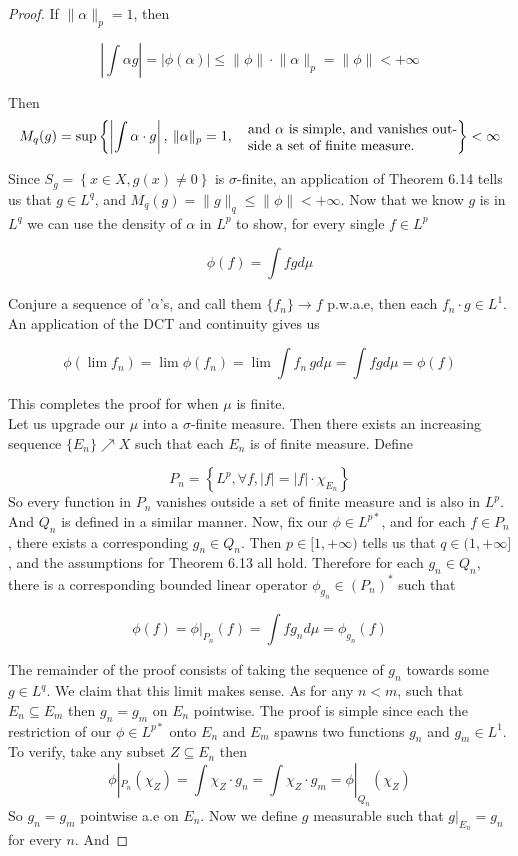 \documentclass[../../main.tex]{subfiles}
\begin{document}
\begin{proof}
If $\lVert \alpha \rVert_p = 1$, then 

$$
\left|\int\alpha g\right| = \left|\phi(\alpha)\right| \leq \lVert \phi \rVert\cdot \lVert \alpha\rVert_p  = \lVert \phi \rVert < +\infty
$$

Then 
\[M_q(g) = \sup\left\{\left|\int \alpha\cdot g\right|,\: \lVert \alpha \rVert_p = 1,\quad  \parbox{15em}{ and $\alpha$ is simple, and vanishes outside a set of finite measure.}\right\}<\infty\]

Since $S_g = \left\{x\in X, g(x) \neq 0\right\}$ is $\sigma$-finite, an application of Theorem 6.14 tells us that $g\in L^q$, and $M_q(g) = \lVert g \rVert_q\leq \lVert \phi \rVert<+\infty$. Now that we know $g$ is in $L^q$ we can use the density of $\alpha$ in $L^p$ to show, for every single $f\in L^p$

\[
\phi(f) = \int fg d\mu
\]

Conjure a sequence of '$\alpha$'s, and call them $\{f_n\} \to f$ p.w.a.e, then each $f_n\cdot g\in L^1$. An application of the DCT and continuity gives us

\[
\phi(\lim f_n) = \lim\phi(f_n) = \lim \int f_n\,gd\mu = \int fgd\mu=\phi(f)
\]

This completes the proof for when $\mu$ is finite.\\[2ex]

Let us upgrade our $\mu$ into a $\sigma$-finite measure. Then there exists an increasing sequence $\{E_n\}\nearrow X$ such that each $E_n$ is of finite measure. Define 

\[
P_n = \left\{L^p, \forall f, |f| = |f|\cdot\chi_{E_n}\right\}
\]
So every function in $P_n$ vanishes outside a set of finite measure and is also in $L^p$. And $Q_n$ is defined in a similar manner. Now, fix our $\phi\in L^{p*}$, and for each $f\in P_n$, there exists a corresponding $g_n\in Q_n$. Then $p\in[1,+\infty)$ tells us that $q\in ( 1,+\infty]$, and the assumptions for Theorem 6.13 all hold. Therefore for each $g_n\in Q_n$, there is a corresponding  bounded linear operator $\phi_{g_n} \in (P_n)^*$ such that 

\[
\phi(f) = \phi|_{P_n}(f) = \int fg_n d\mu = \phi_{g_n}(f)
\]

The remainder of the proof consists of taking the sequence of $g_n$ towards some $g\in L^q$. We claim that this limit makes sense. As for any $n<m$, such that $E_n\subseteq E_m$ then $g_n = g_m$ on $E_n$ pointwise. The proof is simple since each the restriction of our $\phi\in L^{p*}$ onto $E_n$ and $E_m$ spawns two functions $g_n$ and $g_m\in L^1$. To verify, take any subset $Z\subseteq E_n$ then
\[
\phi|_{P_n}(\chi_Z) = \int \chi_Z\cdot g_n = \int \chi_Z\cdot g_m = \phi|_{Q_n}(\chi_Z)
\]
So $g_n = g_m$ pointwise a.e on $E_n$. Now we define $g$ measurable such that $g|_{E_n} = g_n$ for every $n$. And


\end{proof}
\end{document}
